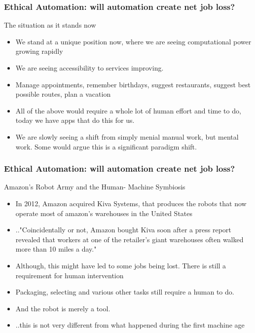 \begin{frame}
	\frametitle{Ethical Automation: will automation create net job loss? }
	{\Large The situation as it stands now}
	\begin{itemize}
	\item We stand at a unique position now, where we are seeing computational power growing rapidly
	\item We are seeing accessibility to services improving.
	\item Manage appointments, remember birthdays, suggest restaurants, suggest best possible routes, plan a vacation
	\item All of the above would require a whole lot of human effort and time to do, today we have apps that do this for us. 
	\item We are slowly seeing a shift from simply menial manual work, but mental work. Some would argue this is a significant paradigm shift.
	
	\end{itemize}
\end{frame}
\begin{frame}
	\frametitle{Ethical Automation: will automation create net job loss? }
	{\Large Amazon's Robot Army and the Human- Machine Symbiosis}
	\begin{itemize}
	\item In 2012, Amazon acquired Kiva Systems, that produces the robots that now operate most of amazon's warehouses in the United States
	\item .."Coincidentally or not, Amazon bought Kiva soon after a press report revealed that workers at one of the retailer’s giant warehouses often walked more than 10 miles a day."
	\item Although, this might have led to some jobs being lost. There is still a requirement for human intervention
	\item Packaging, selecting and various other tasks still require a human to do.
	\item And the robot is merely a tool.
	\item ..this is not very different from what happened during the first machine age
	\end{itemize}
\end{frame}

